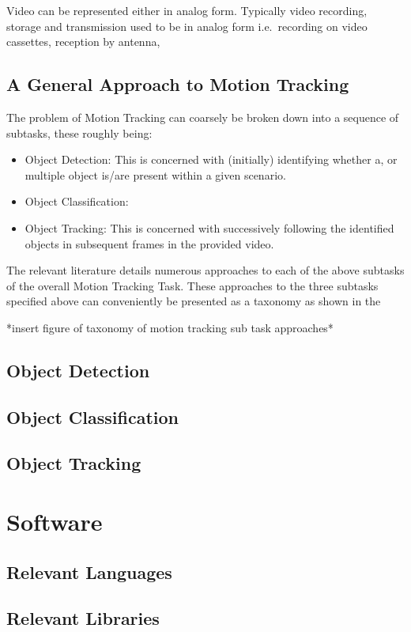 Video can be represented either in analog form.
Typically video recording, storage and transmission used to be in analog form
i.e.\ recording on video cassettes, reception by antenna,  

\subsection{A General Approach to Motion Tracking}\label{literature_review_general_approach}
The problem of Motion Tracking can coarsely be broken down into a sequence of
subtasks, these roughly being:
    \begin{itemize}
        \item Object Detection: This is concerned with (initially) identifying
            whether a, or multiple object is/are present within a given scenario.
        \item Object Classification: 
        \item Object Tracking: This is concerned with successively following the
            identified objects in subsequent frames in the provided video.
    \end{itemize}
The relevant literature details numerous approaches to each of the above
subtasks of the overall Motion Tracking Task. 
These approaches to the three subtasks specified above can conveniently be
presented as a taxonomy as shown in the  

*insert figure of taxonomy of motion tracking sub task approaches*
 
\subsection{Object Detection}

\subsection{Object Classification}

\subsection{Object Tracking}


\section{Software}

\subsection{Relevant Languages}
\subsection{Relevant Libraries}





